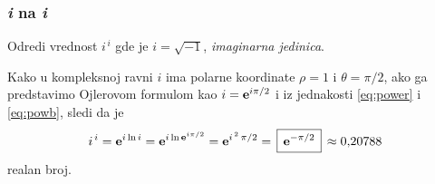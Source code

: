 \subsubsection{\textit{i} na \textit{i}}

\zadatak Odredi vrednost $i^{\,i}$ gde je $i=\sqrt{-1}$, {\sl imaginarna jedinica}.

\resenje
Kako u kompleksnoj ravni $i$ ima polarne koordinate $\rho=1$ i $\theta=\pi/2$, ako ga predstavimo Ojlerovom formulom kao
$i={\bf e}^{i\pi/2}$ i iz jednakosti \eqref{eq:power} i \eqref{eq:powb}, sledi da je
$$
i^{\,i}=\e^{i\ln i} = \e^{i\ln \e^{i\pi/2}}=\e^{i^{\,2}\,\pi/2}=\ram{\e^{-\pi/2}}\approx0\.20788 
$$
realan broj.
